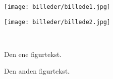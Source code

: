 \begin{figure}[H]
	\centering
	\begin{minipage}[b]{0.48\textwidth}
	\centering
	\texttt{[image: billeder/billede1.jpg]} %
	\end{minipage}
	\hfill
	\begin{minipage}[b]{0.48\textwidth}
	\centering
	\texttt{[image: billeder/billede2.jpg]} %
	\end{minipage}
	\\ %
	\begin{minipage}[t]{0.48\textwidth}
	\caption{Den ene figurtekst.} %
	\label{fig:billede1}
	\end{minipage}
	\hfill
	\begin{minipage}[t]{0.48\textwidth}
	\caption{Den anden figurtekst.} %
	\label{fig:billede2}
	\end{minipage}
\end{figure}
\begin{minipage}[t]{0.6\textwidth}

\end{minipage} \hfill
\begin{minipage}[t]{0.45\textwidth}

\end{minipage}


